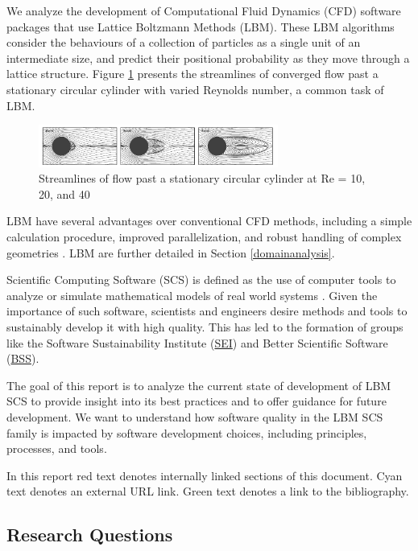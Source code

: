 \documentclass[12pt, notitlepage]{article}
\begin{document}
We analyze the development of Computational Fluid Dynamics (CFD) software packages that use Lattice Boltzmann Methods (LBM). These LBM algorithms consider the behaviours of a collection of particles as a single unit of an intermediate size, and predict their positional probability as they move through a lattice structure. Figure \ref{circularflow} presents the streamlines of converged flow past a stationary circular cylinder with varied Reynolds number, a common task of LBM.

\begin{figure}[h!]
	\begin{center}
		\includegraphics[width=0.7\textwidth]{circularflow}
		\caption{Streamlines of flow past a stationary circular cylinder at Re = 10, 20, and 40 \citep{chen2021phase}}
		\label{circularflow}
	\end{center}
\end{figure}

LBM have several advantages over conventional CFD methods, including a simple calculation procedure, improved parallelization, and robust handling of complex geometries \citep{ganji2015application}. LBM are further detailed in Section \ref{domainanalysis}. 

Scientific Computing Software (SCS) is defined as the use of computer tools to analyze or simulate mathematical models of real world systems \citep{smith2006systematic}. Given the importance of such software, scientists and engineers desire methods and tools to sustainably develop it with high quality. This has led to the formation of groups like the Software Sustainability Institute (\href{https://www.software.ac.uk/}{SEI}) and Better Scientific Software (\href{https://bssw.io/}{BSS}). 

The goal of this report is to analyze the current state of development of LBM SCS to provide insight into its best practices and to offer guidance for future development. We want to understand how software quality in the LBM SCS family is impacted by software development choices, including principles, processes, and tools.

In this report red text denotes internally linked sections of this document. Cyan text denotes an external URL link. Green text denotes a link to the bibliography.

\subsection{Research Questions}\label{purpose}
\end{document}

